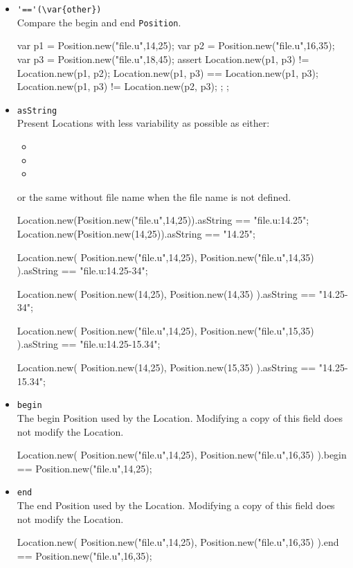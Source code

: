 \begin{itemize}

\item \lstinline|'=='(\var{other})|\\
  Compare the begin and end \lstinline|Position|.
\begin{urbiscript}
{
  var p1 = Position.new("file.u",14,25);
  var p2 = Position.new("file.u",16,35);
  var p3 = Position.new("file.u",18,45);
  assert {
    Location.new(p1, p3) != Location.new(p1, p2);
    Location.new(p1, p3) == Location.new(p1, p3);
    Location.new(p1, p3) != Location.new(p2, p3);
  };
};
\end{urbiscript}

\item \lstinline|asString|\\
  Present Locations with less variability as possible as either:
  \begin{itemize}
  \item {}
  \item {}
  \item {}
  \end{itemize}
  or the same without file name when the file name is not defined.
\begin{urbiassert}
Location.new(Position.new("file.u",14,25)).asString == "file.u:14.25";
Location.new(Position.new(14,25)).asString == "14.25";

Location.new(
  Position.new("file.u",14,25),
  Position.new("file.u",14,35)
).asString == "file.u:14.25-34";

Location.new(
  Position.new(14,25),
  Position.new(14,35)
).asString == "14.25-34";

Location.new(
  Position.new("file.u",14,25),
  Position.new("file.u",15,35)
).asString == "file.u:14.25-15.34";

Location.new(
  Position.new(14,25),
  Position.new(15,35)
).asString == "14.25-15.34";
\end{urbiassert}

\item \lstinline|begin|\\
  The begin Position used by the Location.  Modifying a copy of this field
  does not modify the Location.
\begin{urbiassert}
Location.new(
  Position.new("file.u",14,25),
  Position.new("file.u",16,35)
).begin == Position.new("file.u",14,25);
\end{urbiassert}

\item \lstinline|end|\\
  The end Position used by the Location.  Modifying a copy of this field
  does not modify the Location.
\begin{urbiassert}
Location.new(
  Position.new("file.u",14,25),
  Position.new("file.u",16,35)
).end == Position.new("file.u",16,35);
\end{urbiassert}


\end{itemize}

